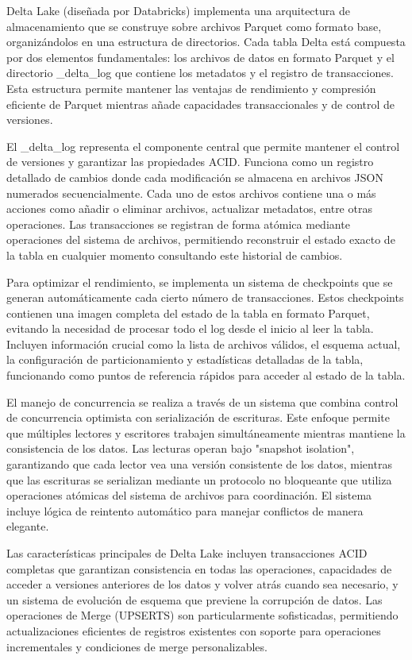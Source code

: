 Delta Lake (diseñada por Databricks) implementa una arquitectura de almacenamiento que se construye sobre archivos Parquet como formato base, 
organizándolos en una estructura de directorios. 
Cada tabla Delta está compuesta por dos elementos fundamentales: los archivos de datos en formato Parquet y el directorio {\_delta\_log} 
que contiene los metadatos y el registro de transacciones. 
Esta estructura permite mantener las ventajas de rendimiento y compresión eficiente de Parquet 
mientras añade capacidades transaccionales y de control de versiones.

El {\_delta\_log} representa el componente central que permite mantener el control de versiones y garantizar las propiedades ACID. 
Funciona como un registro detallado de cambios donde cada modificación se almacena en archivos JSON numerados secuencialmente. 
Cada uno de estos archivos contiene una o más acciones como añadir o eliminar archivos, actualizar metadatos, entre otras operaciones. 
Las transacciones se registran de forma atómica mediante operaciones del sistema de archivos, 
permitiendo reconstruir el estado exacto de la tabla en cualquier momento consultando este historial de cambios.

Para optimizar el rendimiento, se implementa un sistema de checkpoints que se generan automáticamente 
cada cierto número de transacciones. 
Estos checkpoints contienen una imagen completa del estado de la tabla en formato Parquet, 
evitando la necesidad de procesar todo el log desde el inicio al leer la tabla. 
Incluyen información crucial como la lista de archivos válidos, el esquema actual, la configuración de particionamiento 
y estadísticas detalladas de la tabla, funcionando como puntos de referencia rápidos para acceder al estado de la tabla.

El manejo de concurrencia se realiza a través de un sistema que combina control de concurrencia optimista con serialización de escrituras. 
Este enfoque permite que múltiples lectores y escritores trabajen simultáneamente mientras mantiene la consistencia de los datos. 
Las lecturas operan bajo "snapshot isolation", garantizando que cada lector vea una versión consistente de los datos,
mientras que las escrituras se serializan mediante un protocolo no bloqueante 
que utiliza operaciones atómicas del sistema de archivos para coordinación. 
El sistema incluye lógica de reintento automático para manejar conflictos de manera elegante.

Las características principales de Delta Lake incluyen transacciones ACID completas que garantizan consistencia en todas las operaciones, 
capacidades de acceder a versiones anteriores de los datos y volver atrás cuando sea necesario, 
y un sistema de evolución de esquema que previene la corrupción de datos. 
Las operaciones de Merge (UPSERTS) son particularmente sofisticadas, 
permitiendo actualizaciones eficientes de registros existentes con soporte para operaciones incrementales y condiciones de merge personalizables.

